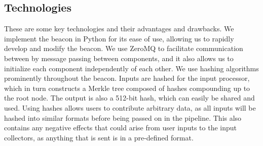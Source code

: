 \subsection{Technologies}
\label{sub:technologies}
These are some key technologies and their advantages and drawbacks.
We implement the beacon in Python for its ease of use, allowing us to rapidly develop and modify the beacon. We use ZeroMQ to facilitate communication between by message passing between components, and it also allows us to initialize each component independently of each other. 
We use hashing algorithms prominently throughout the beacon. Inputs are hashed for the input processor, which in turn constructs a Merkle tree composed of hashes compounding up to the root node. The output is also a 512-bit hash, which can easily be shared and used. Using hashes allows users to contribute arbitrary data, as all inputs will be hashed into similar formats before being passed on in the pipeline. This also contains any negative effects that could arise from user inputs to the input collectors, as anything that is sent is in a pre-defined format.